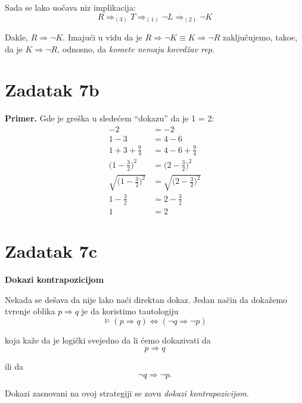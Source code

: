\documentclass[10pt,a4paper]{article}
\newcommand{\impliesid}{\mathop{\Rightarrow}}
\begin{document}
\noindent
Sada se lako uo\v{c}ava niz implikacija:
\[
    R \impliesid_{(3)} T \impliesid_{(1)} \neg L \impliesid_{(2)} \neg K
\]

\noindent
Dakle, $R \Rightarrow \neg K$. Imaju\'ci u vidu da je $R \Rightarrow \neg K \equiv K \Rightarrow \neg R$ zaklju\v{c}ujemo,
tako\dj e, da je $K \Rightarrow \neg R$, odnosno, da \emph{komete nemaju kovrd\v{z}av rep}.

\section{Zadatak 7b}
\textbf{Primer.} Gde je gre\v{s}ka u slede\'cem ``dokazu'' da je 1 = 2:
\begin{align*}
    -2 &= -2 \\
    1-3 &= 4-6 \\
    1+3 + \frac{9}{4} &= 4 - 6 + \frac{9}{4} \\
    \biggl( 1 - \frac{3}{2} \biggr)^2 &= \biggl(2 - \frac{3}{2} \biggr)^2 \\
    \sqrt{\biggl( 1 - \frac{3}{2} \biggr)^2} &= \sqrt{\biggl(2 - \frac{3}{2} \biggr)^2} \\
    1 - \frac{3}{2} &= 2 - \frac{3}{2} \\
    1 &= 2
\end{align*}

\pagebreak
\section{Zadatak 7c}
\begin{center}
    \large\textbf{Dokazi kontrapozicijom}
\end{center}

\vspace*{6px}

\normalsize
Nekada se de\v{s}ava da nije lako na\'ci direktan dokaz. Jedan na\v{c}in da doka\v{z}emo tvr\dj enje oblika
$p \Rightarrow q$ je da koristimo tautologiju
\[
    \models (p \Rightarrow q) \Leftrightarrow (\neg q \Rightarrow \neg p)
\]

\noindent
koja ka\v{z}e da je logi\v{c}ki svejedno da li \'cemo dokazivati da
\[
    p \Rightarrow q
\]

\noindent
ili da
\[
    \neg q \Rightarrow \neg p.
\]

\noindent
Dokazi zasnovani na ovoj strategiji se zovu \emph{dokazi kontrapozicijom}.
\end{document}
